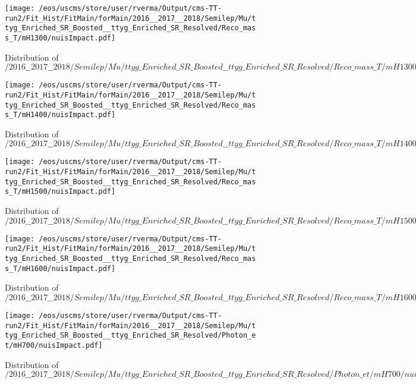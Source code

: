 \begin{figure}
\centering
\texttt{[image: /eos/uscms/store/user/rverma/Output/cms-TT-run2/Fit\_Hist/FitMain/forMain/2016\_\_2017\_\_2018/Semilep/Mu/ttyg\_Enriched\_SR\_Boosted\_\_ttyg\_Enriched\_SR\_Resolved/Reco\_mass\_T/mH1300/nuisImpact.pdf]}
\caption{Distribution of $/2016\_\_2017\_\_2018/Semilep/Mu/ttyg\_Enriched\_SR\_Boosted\_\_ttyg\_Enriched\_SR\_Resolved/Reco\_mass\_T/mH1300/nuisImpact.pdf$}
\end{figure}

\begin{figure}
\centering
\texttt{[image: /eos/uscms/store/user/rverma/Output/cms-TT-run2/Fit\_Hist/FitMain/forMain/2016\_\_2017\_\_2018/Semilep/Mu/ttyg\_Enriched\_SR\_Boosted\_\_ttyg\_Enriched\_SR\_Resolved/Reco\_mass\_T/mH1400/nuisImpact.pdf]}
\caption{Distribution of $/2016\_\_2017\_\_2018/Semilep/Mu/ttyg\_Enriched\_SR\_Boosted\_\_ttyg\_Enriched\_SR\_Resolved/Reco\_mass\_T/mH1400/nuisImpact.pdf$}
\end{figure}

\begin{figure}
\centering
\texttt{[image: /eos/uscms/store/user/rverma/Output/cms-TT-run2/Fit\_Hist/FitMain/forMain/2016\_\_2017\_\_2018/Semilep/Mu/ttyg\_Enriched\_SR\_Boosted\_\_ttyg\_Enriched\_SR\_Resolved/Reco\_mass\_T/mH1500/nuisImpact.pdf]}
\caption{Distribution of $/2016\_\_2017\_\_2018/Semilep/Mu/ttyg\_Enriched\_SR\_Boosted\_\_ttyg\_Enriched\_SR\_Resolved/Reco\_mass\_T/mH1500/nuisImpact.pdf$}
\end{figure}

\begin{figure}
\centering
\texttt{[image: /eos/uscms/store/user/rverma/Output/cms-TT-run2/Fit\_Hist/FitMain/forMain/2016\_\_2017\_\_2018/Semilep/Mu/ttyg\_Enriched\_SR\_Boosted\_\_ttyg\_Enriched\_SR\_Resolved/Reco\_mass\_T/mH1600/nuisImpact.pdf]}
\caption{Distribution of $/2016\_\_2017\_\_2018/Semilep/Mu/ttyg\_Enriched\_SR\_Boosted\_\_ttyg\_Enriched\_SR\_Resolved/Reco\_mass\_T/mH1600/nuisImpact.pdf$}
\end{figure}

\begin{figure}
\centering
\texttt{[image: /eos/uscms/store/user/rverma/Output/cms-TT-run2/Fit\_Hist/FitMain/forMain/2016\_\_2017\_\_2018/Semilep/Mu/ttyg\_Enriched\_SR\_Boosted\_\_ttyg\_Enriched\_SR\_Resolved/Photon\_et/mH700/nuisImpact.pdf]}
\caption{Distribution of $/2016\_\_2017\_\_2018/Semilep/Mu/ttyg\_Enriched\_SR\_Boosted\_\_ttyg\_Enriched\_SR\_Resolved/Photon\_et/mH700/nuisImpact.pdf$}
\end{figure}

